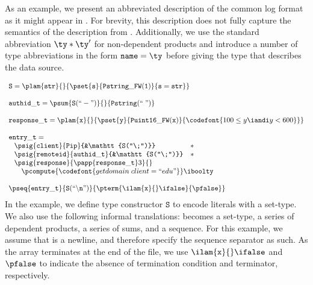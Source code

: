As an example, we present an abbreviated description of the common log
format as it might appear in \ddc{}. For brevity,
this description does not fully capture the semantics of the
\ipads{} description from . Additionally, we
use the standard abbreviation $\ty * \ty'$ for non-dependent products and introduce a number of type abbreviations
in the form $\mathtt{name} = \ty$ before giving the type that describes the data source.

{\small
\[
\begin{array}{l}
\mathtt{S} = \plam {\mathtt{str}} {} {\pset {\mathtt{s}}
  {\mathtt{Pstring\_FW(1)}} {\mathtt{s = str}}}\\
\\
\mathtt{authid\_t} = 
\psum {\mathtt{S(``-")}} {} {\mathtt{Pstring(``\;")}}\\
\\
\mathtt{response\_t} = \plam {\mathtt x} {} {
      \pset {\mathtt y} {\mathtt{Puint16\_FW(x)}} 
      {\codefont{100 \leq y \iandi y < 600}}
    }\\
\\
\mathtt{entry\_t} = \\ \;
\begin{array}{lll}
\psig {\mathtt{client}} {\mathtt{Pip}} {&\mathtt{S(``\;")}} &* \\
\psig {\mathtt{remoteid}} {\mathtt{authid\_t}} {&\mathtt{S(``\;")}} &* \\
\psig {\mathtt{response}} {
  \papp
    {\mathtt{response\_t}} 3
}{} \\
\multicolumn{3}{c}{
\quad \pcompute {\codefont{getdomain\;client = ``edu"}} \iboolty}
\end{array}\\
\\
\pseq {\mathtt{entry\_t}} {\mathtt{S(``\backslash n")}}{
  \pterm {\ilam {\mathtt x} {} \ifalse} {\pfalse}
}
\end{array}
\]}%
\noindent
In the example, we define type constructor $\mathtt{S}$ to encode literals
with a set-type. We also use the following
informal translations: \Pwhere{} becomes a set-type, \Pstruct{} a
series of dependent products, \Punion{} a series of sums, and
\Parray{} a sequence. For this example, we assume that \Peor{} is a newline, and therefore specify the sequence
separator as such. As the array terminates at the end of the file, we
use $\ilam {\mathtt x} {} \ifalse$ and $\pfalse$ to indicate the
absence of termination condition and terminator, respectively.

